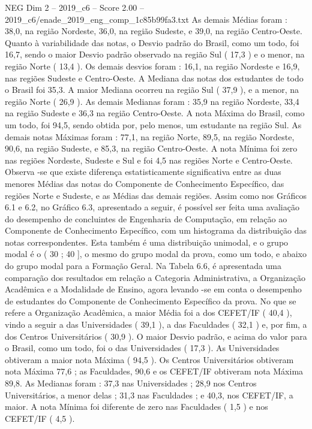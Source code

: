 \begin{textsample}{NEG Dim 2 – 2019\_c6 – Score 2.00 – 2019\_c6/enade\_2019\_eng\_comp\_1c85b99fa3.txt}
As demais Médias foram : 38,0, na região Nordeste, 36,0, na região Sudeste, e 39,0, na região Centro-Oeste.
Quanto à variabilidade das notas, o Desvio padrão do Brasil, como um todo, foi 16,7, sendo o maior Desvio padrão observado na região Sul ( 17,3 ) e o menor, na região Norte ( 13,4 ).
Os demais desvios foram : 16,1, na região Nordeste e 16,9, nas regiões Sudeste e Centro-Oeste.
A Mediana das notas dos estudantes de todo o Brasil foi 35,3.
A maior Mediana ocorreu na região Sul ( 37,9 ), e a menor, na região Norte ( 26,9 ).
As demais Medianas foram : 35,9 na região Nordeste, 33,4 na região Sudeste e 36,3 na região Centro-Oeste.
A nota Máxima do Brasil, como um todo, foi 94,5, sendo obtida por, pelo menos, um estudante na região Sul.
As demais notas Máximas foram : 77,1, na região Norte, 89,5, na região Nordeste, 90,6, na região Sudeste, e 85,3, na região Centro-Oeste.
A nota Mínima foi zero nas regiões Nordeste, Sudeste e Sul e foi 4,5 nas regiões Norte e Centro-Oeste.
Observa -se que existe diferença estatisticamente significativa entre as duas menores Médias das notas do Componente de Conhecimento Específico, das regiões Norte e Sudeste, e as Médias das demais regiões.
Assim como nos Gráficos 6.1 e 6.2, no Gráfico 6.3, apresentado a seguir, é possível ser feita uma avaliação do desempenho de concluintes de Engenharia de Computação, em relação ao Componente de Conhecimento Específico, com um histograma da distribuição das notas correspondentes.
Esta também é uma distribuição unimodal, e o grupo modal é o ( 30 ; 40 ], o mesmo do grupo modal da prova, como um todo, e abaixo do grupo modal para a Formação Geral.
Na Tabela 6.6, é apresentada uma comparação dos resultados em relação a Categoria Administrativa, a Organização Acadêmica e a Modalidade de Ensino, agora levando -se em conta o desempenho de estudantes do Componente de Conhecimento Específico da prova.
No que se refere a Organização Acadêmica, a maior Média foi a dos CEFET/IF ( 40,4 ), vindo a seguir a das Universidades ( 39,1 ), a das Faculdades ( 32,1 ) e, por fim, a dos Centros Universitários ( 30,9 ).
O maior Desvio padrão, e acima do valor para o Brasil, como um todo, foi o das Universidades ( 17,3 ).
As Universidades obtiveram a maior nota Máxima ( 94,5 ).
Os Centros Universitários obtiveram nota Máxima 77,6 ; as Faculdades, 90,6 e os CEFET/IF obtiveram nota Máxima 89,8.
As Medianas foram : 37,3 nas Universidades ; 28,9 nos Centros Universitários, a menor delas ; 31,3 nas Faculdades ; e 40,3, nos CEFET/IF, a maior.
A nota Mínima foi diferente de zero nas Faculdades ( 1,5 ) e nos CEFET/IF ( 4,5 ).

\end{textsample}
